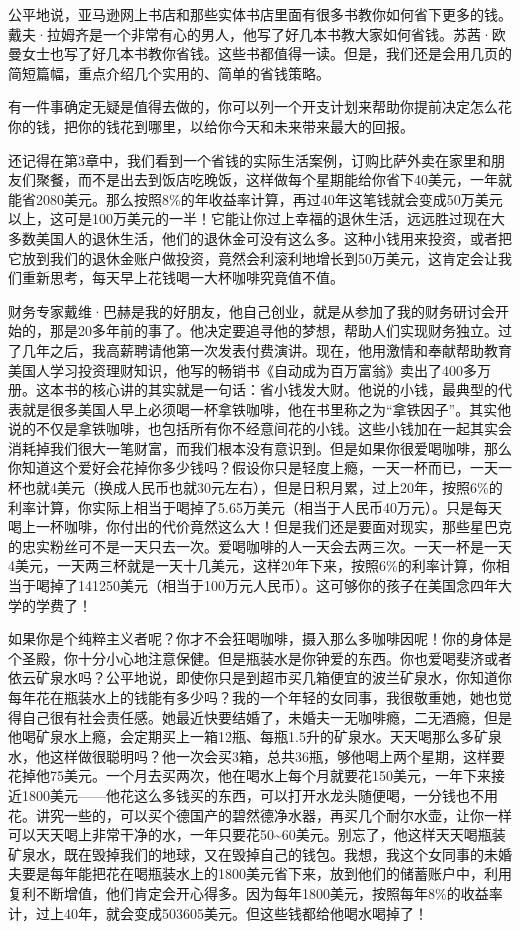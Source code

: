 公平地说，亚马逊网上书店和那些实体书店里面有很多书教你如何省下更多的钱。戴夫·拉姆齐是一个非常有心的男人，他写了好几本书教大家如何省钱。苏茜·欧曼女士也写了好几本书教你省钱。这些书都值得一读。但是，我们还是会用几页的简短篇幅，重点介绍几个实用的、简单的省钱策略。

有一件事确定无疑是值得去做的，你可以列一个开支计划来帮助你提前决定怎么花你的钱，把你的钱花到哪里，以给你今天和未来带来最大的回报。

还记得在第3章中，我们看到一个省钱的实际生活案例，订购比萨外卖在家里和朋友们聚餐，而不是出去到饭店吃晚饭，这样做每个星期能给你省下40美元，一年就能省2080美元。那么按照8\%的年收益率计算，再过40年这笔钱就会变成50万美元以上，这可是100万美元的一半！它能让你过上幸福的退休生活，远远胜过现在大多数美国人的退休生活，他们的退休金可没有这么多。这种小钱用来投资，或者把它放到我们的退休金账户做投资，竟然会利滚利地增长到50万美元，这肯定会让我们重新思考，每天早上花钱喝一大杯咖啡究竟值不值。

财务专家戴维·巴赫是我的好朋友，他自己创业，就是从参加了我的财务研讨会开始的，那是20多年前的事了。他决定要追寻他的梦想，帮助人们实现财务独立。过了几年之后，我高薪聘请他第一次发表付费演讲。现在，他用激情和奉献帮助教育美国人学习投资理财知识，他写的畅销书《自动成为百万富翁》卖出了400多万册。这本书的核心讲的其实就是一句话：省小钱发大财。他说的小钱，最典型的代表就是很多美国人早上必须喝一杯拿铁咖啡，他在书里称之为“拿铁因子”。其实他说的不仅是拿铁咖啡，也包括所有你不经意间花的小钱。这些小钱加在一起其实会消耗掉我们很大一笔财富，而我们根本没有意识到。但是如果你很爱喝咖啡，那么你知道这个爱好会花掉你多少钱吗？假设你只是轻度上瘾，一天一杯而已，一天一杯也就4美元（换成人民币也就30元左右），但是日积月累，过上20年，按照6\%的利率计算，你实际上相当于喝掉了5.65万美元（相当于人民币40万元）。只是每天喝上一杯咖啡，你付出的代价竟然这么大！但是我们还是要面对现实，那些星巴克的忠实粉丝可不是一天只去一次。爱喝咖啡的人一天会去两三次。一天一杯是一天4美元，一天两三杯就是一天十几美元，这样20年下来，按照6\%的利率计算，你相当于喝掉了141250美元（相当于100万元人民币）。这可够你的孩子在美国念四年大学的学费了！

如果你是个纯粹主义者呢？你才不会狂喝咖啡，摄入那么多咖啡因呢！你的身体是个圣殿，你十分小心地注意保健。但是瓶装水是你钟爱的东西。你也爱喝斐济或者依云矿泉水吗？公平地说，即使你只是到超市买几箱便宜的波兰矿泉水，你知道你每年花在瓶装水上的钱能有多少吗？我的一个年轻的女同事，我很敬重她，她也觉得自己很有社会责任感。她最近快要结婚了，未婚夫一无咖啡瘾，二无酒瘾，但是他喝矿泉水上瘾，会定期买上一箱12瓶、每瓶1.5升的矿泉水。天天喝那么多矿泉水，他这样做很聪明吗？他一次会买3箱，总共36瓶，够他喝上两个星期，这样要花掉他75美元。一个月去买两次，他在喝水上每个月就要花150美元，一年下来接近1800美元——他花这么多钱买的东西，可以打开水龙头随便喝，一分钱也不用花。讲究一些的，可以买个德国产的碧然德净水器，再买几个耐尔水壶，让你一样可以天天喝上非常干净的水，一年只要花50\textasciitilde{}60美元。别忘了，他这样天天喝瓶装矿泉水，既在毁掉我们的地球，又在毁掉自己的钱包。我想，我这个女同事的未婚夫要是每年能把花在喝瓶装水上的1800美元省下来，放到他们的储蓄账户中，利用复利不断增值，他们肯定会开心得多。因为每年1800美元，按照每年8\%的收益率计，过上40年，就会变成503605美元。但这些钱都给他喝水喝掉了！

